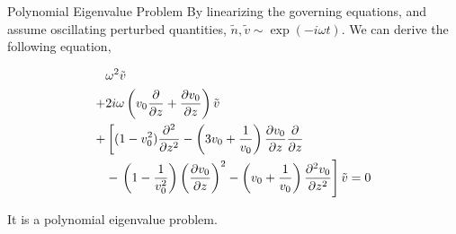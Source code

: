 \begin{frame}{Polynomial Eigenvalue Problem}
  By linearizing the governing equations, and assume oscillating perturbed quantities, $\tilde{n}, \tilde{v} \sim \exp(-i\omega t)$. We can derive the following equation,

  \begin{equation}
    \begin{aligned}
      &\omega^2 \tilde{v} \\ 
      +& 2i\omega\left(v_0\pdv{}{z} + \pdv{v_0}{z}\right) \tilde{v} \\
      +& \left[ (1-v_0^2)\pdv[2]{}{z} 
        -\left(3v_0 + \frac{1}{v_0}\right)\pdv{v_0}{z}\pdv{}{z} \right. \\
        &- \left. \left(1-\frac{1}{v_0^2}\right)\left(\pdv{v_0}{z}\right)^2 
      - \left(v_0+\frac{1}{v_0}\right)\pdv[2]{v_0}{z} \right]\tilde{v}
      = 0
    \end{aligned}
    \label{eq:polynomial_eigenvalue_problem}
  \end{equation}

  It is a polynomial eigenvalue problem.
\end{frame}
